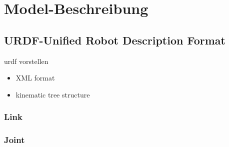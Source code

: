 \section{Model-Beschreibung}

\subsection{URDF-Unified Robot Description Format}
urdf vorstellen

\begin{itemize}
\item XML format
\item kinematic tree structure
\end{itemize}

\subsubsection*{Link}

\subsubsection*{Joint}

